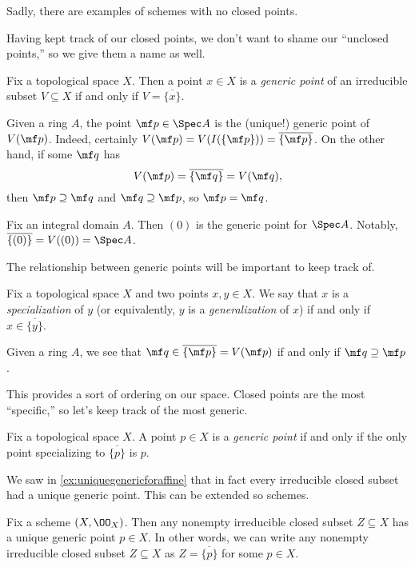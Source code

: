 \documentclass[../notes.tex]{subfiles}
\begin{document}
\begin{remark}
	Sadly, there are examples of schemes with no closed points.
\end{remark}
Having kept track of our closed points, we don't want to shame our ``unclosed points,'' so we give them a name as well.
\begin{definition}
	Fix a topological space $X$. Then a point $x\in X$ is a \textit{generic point} of an irreducible subset $V\subseteq X$ if and only if $V=\overline{\{x\}}$.
\end{definition}
\begin{example} \label{ex:uniquegenericforaffine}
	Given a ring $A$, the point $\mf p\in\Spec A$ is the (unique!) generic point of $V(\mf p)$. Indeed, certainly $V(\mf p)=V(I(\{\mf p\}))=\overline{\{\mf p\}}$. On the other hand, if some $\mf q$ has
	\[V(\mf p)=\overline{\{\mf q\}}=V(\mf q),\]
	then $\mf p\supseteq\mf q$ and $\mf q\supseteq\mf p$, so $\mf p=\mf q$.
\end{example}
\begin{example}
	Fix an integral domain $A$. Then $(0)$ is the generic point for $\Spec A$. Notably, $\overline{\{(0)\}}=V((0))=\Spec A$.
\end{example}
The relationship between generic points will be important to keep track of.
\begin{defihelper}  
	Fix a topological space $X$ and two points $x,y\in X$. We say that $x$ is a \textit{specialization} of $y$ (or equivalently, $y$ is a \textit{generalization} of $x$) if and only if $x\in\overline{\{y\}}$.
\end{defihelper}
\begin{example}
	Given a ring $A$, we see that $\mf q\in\overline{\{\mf p\}}=V(\mf p)$ if and only if $\mf q\supseteq\mf p$.
\end{example}
This provides a sort of ordering on our space. Closed points are the most ``specific,'' so let's keep track of the most generic.
\begin{definition}
	Fix a topological space $X$. A point $p\in X$ is a \textit{generic point} if and only if the only point specializing to $\overline{\{p\}}$ is $p$.
\end{definition}
We saw in \autoref{ex:uniquegenericforaffine} that in fact every irreducible closed subset had a unique generic point. This can be extended so schemes.
\begin{lemma} \label{lem:uniq-generic}
	Fix a scheme $(X,\OO_X)$. Then any nonempty irreducible closed subset $Z\subseteq X$ has a unique generic point $p\in X$. In other words, we can write any nonempty irreducible closed subset $Z\subseteq X$ as $Z=\overline{\{p\}}$ for some $p\in X$.
\end{lemma}
\end{document}
